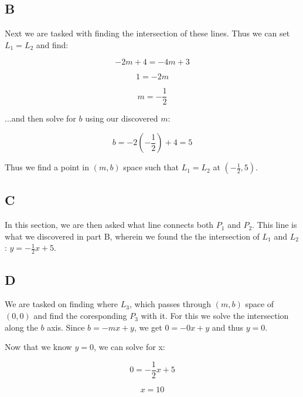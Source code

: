 \documentclass{article}
\begin{document}
\subsection*{B}

Next we are tasked with finding the intersection of these lines. Thus we can set $L_1=L_2$ and find:

\begin{equation}
    -2m + 4 = -4m + 3
\end{equation}

\begin{equation}
    1 = -2m
\end{equation}

\begin{equation}
    m = -\frac{1}{2}
\end{equation}

\noindent ...and then solve for $b$ using our discovered $m$:

\begin{equation}
    b = -2(-\frac{1}{2}) + 4 = 5
\end{equation}

\noindent Thus we find a point in $(m,b)$ space such that $L_1=L_2$ at $(-\frac{1}{2}, 5)$.

\subsection*{C}

In this section, we are then asked what line connects both $P_1$ and $P_2$. This line is what we discovered in part B, wherein we found the the intersection of $L_1$ and $L_2$: $y = -\frac{1}{2}x + 5$.

\subsection*{D}

We are tasked on finding where $L_3$, which passes through $(m,b)$ space of $(0,0)$ and find the coresponding $P_3$ with it. For this we solve the intersection along the $b$ axis. Since $b = -mx + y$, we get $0 = -0x + y$ and thus $y = 0$.

Now that we know $y=0$, we can solve for x:

\begin{equation}
    0 = -\frac{1}{2}x + 5
\end{equation}

\begin{equation}
    x = 10
\end{equation}
\end{document}
